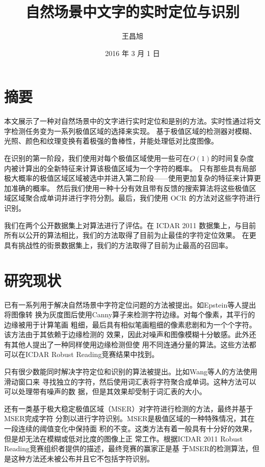 \documentclass[UTF8]{ctexart}
\author{王昌旭}
\date{2016 年 3 月 1 日}
\title{自然场景中文字的实时定位与识别}
\begin{document}
\maketitle

\section{摘要}

本文展示了一种对自然场景中的文字进行实时定位和是别的方法。实时性通过将文字检测任务变为一系列极值区域的选择来实现。
基于极值区域的检测器对模糊、光照、颜色和纹理变换有着极强的鲁棒性，并能处理低对比度图像。

在识别的第一阶段，我们使用对每个极值区域使用一些可在$O(1)$的时间复杂度内被计算出的全新特征来计算该极值区域为一个字符的概率。
只有那些具有局部极大概率的极值区域区域被选中并进入第二阶段——使用更加复杂的特征来计算更加准确的概率。
然后我们使用一种十分有效且带有反馈的搜索算法将这些极值区域区域聚合成单词并进行字符分割。最后，我们使用 OCR 的方法对这些字符进行识别。

我们在两个公开数据集上对算法进行了评估。在 ICDAR 2011 数据集上，与目前所有以公开的算法相比，我们的方法取得了目前为止最佳的字符定位效果。
在更具有挑战性的街景数据集上，我们的方法取得了目前为止最高的召回率。

\section{研究现状}

已有一系列用于解决自然场景中字符定位问题的方法被提出。如Epstein等人提出将图像转
换为灰度图后使用Canny算子来检测字符边缘。对每个像素，其平行的边缘被用于计算笔画
粗细，最后具有相似笔画粗细的像素悲剧和为一个个字符。该方法由于其依赖于边缘检测的
效果，因此对噪声和图像模糊十分敏感。此外还有其他人提出了一种同样使用边缘检测但使
用不同连通分量的算法。这些方法都可以在ICDAR Robust Reading竞赛结果中找到。

只有很少数能同时解决字符定位和识别的算法被提出。比如Wang等人的方法使用滑动窗口来
寻找独立的字符，然后使用词汇表将字符聚合成单词。这种方法可以可以处理带有噪声的数
据，但是其效果却受制于词汇表的大小。

还有一类基于极大稳定极值区域（MSER）对字符进行检测的方法，最终并基于MSER完成字符
分割以进行字符识别。MSER是极值区域的一种特殊情况，其在一段连续的阈值变化中保持面
积的不变。这类方法有着一般具有十分好的效果，但是却无法在模糊或低对比度的图像上正
常工作。根据ICDAR 2011 Robust Reading竞赛组织者提供的描述，最终竞赛的赢家正是基
于MSER的检测算法，但是这种方法还未被公布并且它不包括字符识别。
\end{document}
